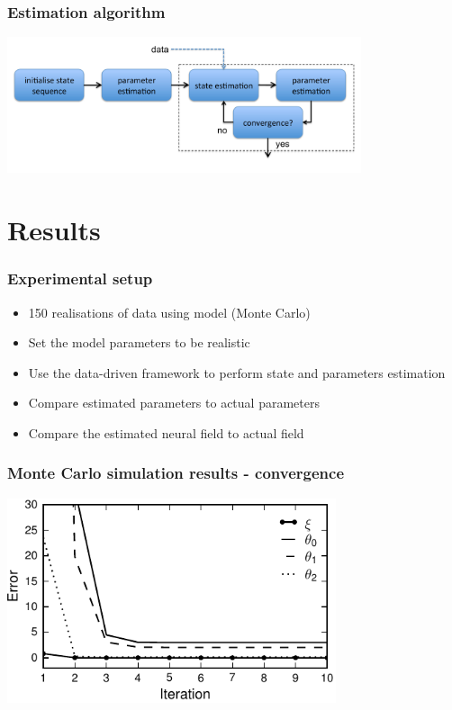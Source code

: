 \documentclass[compress]{beamer}
\begin{document}
\begin{frame}\frametitle{Estimation algorithm}
\begin{center}
	\includegraphics[height=4cm]{./Figures/EstimationAlgorithm7.pdf}
\end{center}
\end{frame}

\section[Results]{Results}

\begin{frame}\frametitle{Experimental setup}
\begin{itemize}
	\item 150 realisations of data using model (Monte Carlo)
	\item Set the model parameters to be realistic
	\item Use the data-driven framework to perform state and parameters estimation
	\item Compare estimated parameters to actual parameters
	\item Compare the estimated neural field to actual field
\end{itemize}	
\end{frame}

\begin{frame}\frametitle{Monte Carlo simulation results - convergence}
	\begin{center}
		\includegraphics[height=6cm]{./Figures/fig6.pdf}
	\end{center}
\end{frame}
\end{document}
